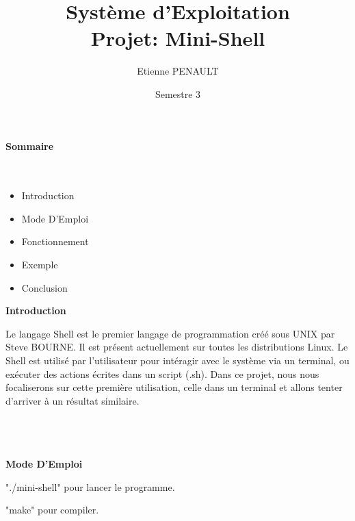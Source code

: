 \documentclass [12pt]{article}
\title{Système d'Exploitation\\Projet: Mini-Shell}
\author{Etienne PENAULT}
\date{Semestre 3}
\begin{document}
\maketitle
\clearpage
\textbf {\Large Sommaire\\\\\\}

\begin{itemize}
  \item \large Introduction \\
  \item Mode D'Emploi\\
  \item Fonctionnement\\
  \item Exemple\\
  \item Conclusion\\
\end{itemize}

\clearpage

\textbf {\Large Introduction\\}

Le langage Shell est le premier langage de programmation créé sous UNIX par Steve BOURNE. Il est présent actuellement sur toutes les distributions Linux. Le Shell est utilisé par l'utilisateur pour intéragir avec le système via un terminal, ou exécuter des actions écrites dans un script (.sh).
Dans ce projet, nous nous focaliserons sur cette première utilisation, celle dans un terminal et allons tenter d'arriver à un résultat similaire.

\textbf {\\\\\\\Large Mode D'Emploi\\}

"./mini-shell" pour lancer le programme.

"make" pour compiler.
\end{document}
